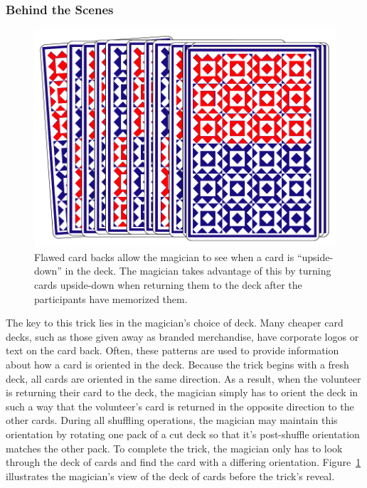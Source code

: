 \subsubsection{Behind the Scenes}

\begin{figure}[H]
\centering
\includegraphics[scale=.7]{images/Trick2}
\caption{Flawed card backs allow the magician to see when a card is
``upside-down'' in the deck.  The magician takes advantage of this by
  turning cards upside-down when returning
  them to the deck after the participants have memorized them.}
\label{fig:trick2}
\end{figure}

The key to this trick lies in the magician's choice of deck.  Many cheaper card
decks, such as those given away as branded merchandise,
have corporate logos or
text on the card back.  Often, these patterns are used to
provide information about how a card is oriented in the deck.  Because the trick
begins with a fresh deck, all cards are oriented in the same direction.  As a
result, when the volunteer is returning their card to the deck, the magician
simply has to orient the deck in such a way that the volunteer's card is returned
in the opposite direction to the other cards.  During all shuffling
operations, the magician may maintain this orientation by rotating one pack of a
cut deck so that it's post-shuffle orientation matches the other pack.
To complete the trick, the magician only has to look through the deck of cards
and find the card with a differing orientation.  Figure~\ref{fig:trick2}
illustrates the magician's view of the deck of cards before the trick's
reveal.

